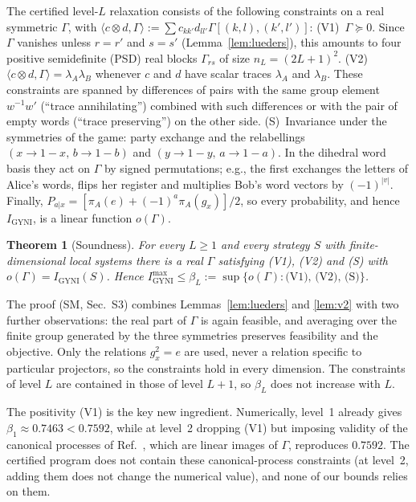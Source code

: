 \documentclass[aps,prl,twocolumn,superscriptaddress,longbibliography,nofootinbib]{revtex4-2}
\newtheorem{theorem}{Theorem}
\newcommand{\Igy}{I_{\mathrm{GYNI}}}
\newcommand{\Imax}{I_{\mathrm{GYNI}}^{\max}}
\begin{document}
The certified level-$L$ relaxation consists of the following constraints on a real symmetric $\Gamma$, with $\langle c\otimes d,\Gamma\rangle:=\sum c_{kk'}d_{ll'}\Gamma[(k,l),(k',l')]$:
(V1)~$\Gamma\succeq0$. Since $\Gamma$ vanishes unless $r=r'$ and $s=s'$ (Lemma~\ref{lem:lueders}), this amounts to four positive semidefinite (PSD) real blocks $\Gamma_{rs}$ of size $n_L=(2L+1)^2$.
(V2)~$\langle c\otimes d,\Gamma\rangle=\lambda_A\lambda_B$ whenever $c$ and $d$ have scalar traces $\lambda_A$ and $\lambda_B$. These constraints are spanned by differences of pairs with the same group element $w^{-1}w'$ (``trace annihilating'') combined with such differences or with the pair of empty words (``trace preserving'') on the other side.
(S)~Invariance under the symmetries of the game: party exchange and the relabellings $(x\to1-x,\,b\to1-b)$ and $(y\to1-y,\,a\to1-a)$. In the dihedral word basis they act on $\Gamma$ by signed permutations; e.g., the first exchanges the letters of Alice's words, flips her register and multiplies Bob's word vectors by $(-1)^{|v|}$.
Finally, $P_{a|x}=[\pi_A(e)+(-1)^a\pi_A(g_x)]/2$, so every probability, and hence $\Igy$, is a linear function $o(\Gamma)$.

\begin{theorem}[Soundness]\label{thm:sound}
For every $L\ge1$ and every strategy $S$ with finite-dimensional local systems there is a real $\Gamma$ satisfying (V1), (V2) and (S) with $o(\Gamma)=\Igy(S)$. Hence $\Imax\le\beta_L:=\sup\{o(\Gamma):\text{(V1), (V2), (S)}\}$.
\end{theorem}

The proof (SM, Sec.~S3) combines Lemmas~\ref{lem:lueders} and \ref{lem:v2} with two further observations: the real part of $\Gamma$ is again feasible, and averaging over the finite group generated by the three symmetries preserves feasibility and the objective. Only the relations $g_x^2=e$ are used, never a relation specific to particular projectors, so the constraints hold in every dimension. The constraints of level $L$ are contained in those of level $L+1$, so $\beta_L$ does not increase with $L$.

The positivity (V1) is the key new ingredient. Numerically, level~1 already gives $\beta_1\approx0.7463<0.7592$, while at level~2 dropping (V1) but imposing validity of the canonical processes of Ref.~\cite{LiuChiribella2025}, which are linear images of $\Gamma$, reproduces $0.7592$. The certified program does not contain these canonical-process constraints (at level~2, adding them does not change the numerical value), and none of our bounds relies on them.
\end{document}
